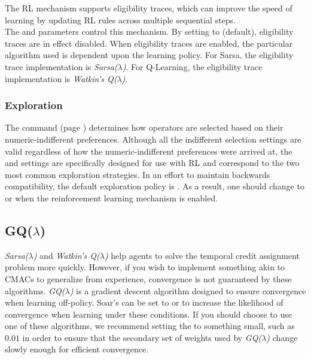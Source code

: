 The RL mechanism supports eligibility traces, which can improve the speed of learning by 
updating RL rules across multiple sequential steps. \\
The  and  parameters control this mechanism.
By setting  to  (default), eligibility traces are in effect disabled.
When eligibility traces are enabled, the particular algorithm used is dependent upon the learning policy.
For Sarsa, the eligibility trace implementation is \emph{Sarsa($\lambda$)}. 
For Q-Learning, the eligibility trace implementation is \emph{Watkin's Q($\lambda$)}.

\subsubsection{Exploration}

The  command (page \pageref{decide-indifferent-selection}) determines how operators are selected based on their numeric-indifferent preferences.
Although all the indifferent selection settings are valid regardless of how the numeric-indifferent preferences were arrived at, the  and  settings are specifically designed for use with RL and correspond to the two most common exploration strategies.
In an effort to maintain backwards compatibility, the default exploration policy is .
As a result, one should change to  or  when the reinforcement learning mechanism is enabled.

\subsection{\texorpdfstring{GQ($\lambda$)}{GQ(lambda)}}

\emph{Sarsa($\lambda$)} and \emph{Watkin's Q($\lambda$)} help agents to solve the temporal credit assignment problem more quickly.
However, if you wish to implement something akin to CMACs to generalize from experience, convergence is not guaranteed by these algorithms.
\emph{GQ($\lambda$)} is a gradient descent algorithm designed to ensure convergence when learning off-policy.
Soar's  can be set to  or  to increase the likelihood of convergence when learning under these conditions.
If you should choose to use one of these algorithms, we recommend setting the   to something small, such as $0.01$ in order to ensure that the secondary set of weights used by \emph{GQ($\lambda$)} change slowly enough for efficient convergence.

